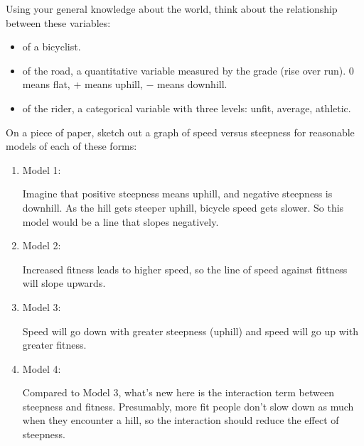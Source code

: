 
Using your general knowledge about the world, think about the
relationship between these variables:
\begin{itemize}
\item {} of a bicyclist.
\item {} of the road, a quantitative variable 
measured by the grade (rise over
run). 0 means flat, + means uphill, $-$ means downhill.
\item {} of the rider, a categorical variable with three
levels: unfit, average, athletic.
\end{itemize}

On a piece of paper, sketch out a graph of speed versus steepness for reasonable models
of each of these forms:
\begin{enumerate}
\item Model 1: 

\begin{AnswerText}
Imagine that positive steepness means uphill, and negative steepness
is downhill. 
As the hill gets steeper uphill, bicycle speed gets slower.  So this
model would be a line that slopes negatively.
\end{AnswerText}

\item Model 2: 

\begin{AnswerText}
Increased fitness leads to higher speed, so the line of speed against fittness will slope upwards.
\end{AnswerText}

\item Model 3: 

\begin{AnswerText}
Speed will go down with greater steepness (uphill) and speed will go
up with greater fitness.
\end{AnswerText}

\item Model 4: 

\begin{AnswerText}
Compared to Model 3, what's new here is the interaction term between
steepness and fitness.  Presumably, more fit people don't slow down as
much when they encounter a hill, so the interaction should reduce the
effect of steepness.
\end{AnswerText}
\end{enumerate}